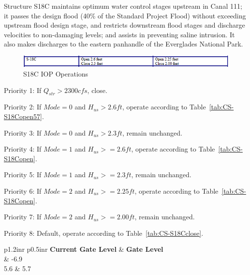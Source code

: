 Structure S18C maintains optimum water control stages upstream in Canal 111; it passes the design flood (40\% of the Standard Project Flood) without exceeding upstream flood design stage, and restricts downstream flood stages and discharge velocities to non-damaging levels; and assists in preventing saline intrusion. It also makes discharges to the eastern panhandle of the Everglades National Park.



\begin{figure}[!h]
  \begin{center}
  \includegraphics[width=6.5in]{../figs/S18C_IOPops.png}
  \caption{S18C IOP Operations}
  \label{fig:S18Ciop}
  \end{center}
\end{figure}


\begin{packed_items}
\item Priority 1: If $Q_{str}>2300 cfs$, close.
\item[]
\item Priority 2: If $Mode=0$ and $H_{us}>2.6 ft$, operate according to Table~\ref{tab:CS-S18Copen57}.
\item Priority 3: If $Mode=0$ and $H_{us}>2.3 ft$, remain unchanged.
\item[]
\item Priority 4: If $Mode=1$ and $H_{us}>=2.6 ft$, operate according to Table~\ref{tab:CS-S18Copen}.
\item Priority 5: If $Mode=1$ and $H_{us}>=2.3 ft$, remain unchanged.
\item[]
\item Priority 6: If $Mode=2$ and $H_{us}>=2.25 ft$, operate according to Table~\ref{tab:CS-S18Copen}.
\item Priority 7: If $Mode=2$ and $H_{us}>=2.00 ft$, remain unchanged.
\item[]
\item Priority 8: Default, operate according to Table~\ref{tab:CS-S18Cclose}.
\end{packed_items}

\footnotesize
\begin{table}[!h]
\centering
\caption{Control strategy for S18C open (MAX 5.7) (units are ft. NGVD29)}
\label{tab:CS-S18Copen57}
\begin{tabular}{p{1.2in}{r} p{0.5in}{r}}
\hline
\textbf{Current Gate Level} & \textbf{Gate Level}\\
	& -6.9       \\
5.6	& 5.7   \\
\hline
\end{tabular}
\end{table}
\normalsize

